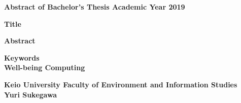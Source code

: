 \begin{center}
\textbf{\large Abstract of Bachelor's Thesis Academic Year 2019}

\vspace{6mm}

\textbf{\large Title}
\end{center}

\vspace{10mm}


\begin{flushleft}
\textbf{Abstract}\\
\end{flushleft}

\begin{flushleft}
\textbf{Keywords}\\
\textbf{Well-being Computing}
\end{flushleft}

\begin{flushright}
\textbf{Keio University Faculty of Environment and Information Studies}\\
\textbf{Yuri Sukegawa}\\
\end{flushright}